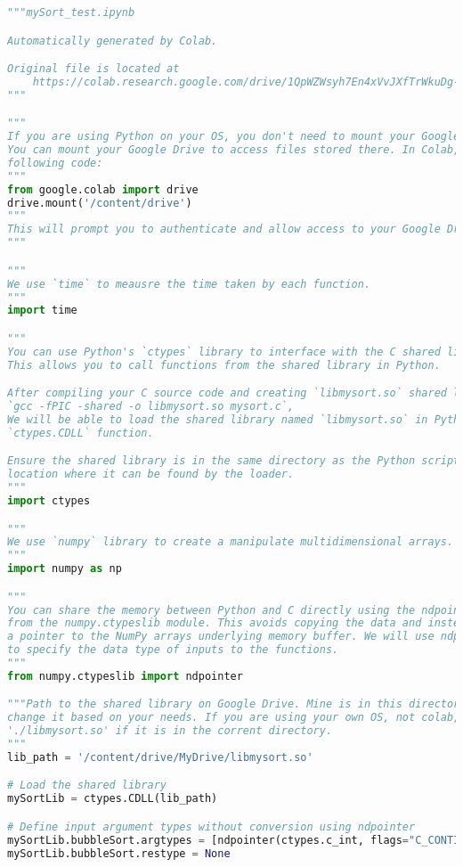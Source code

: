 \documentclass[12pt]{article}
\begin{document}
\begin{lstlisting}[language=python]
"""mySort_test.ipynb

Automatically generated by Colab.

Original file is located at
    https://colab.research.google.com/drive/1QpWZWsyh7En4xVvJXfTrWkuDg-YcOtoK
"""

"""
If you are using Python on your OS, you don't need to mount your Google Drive.
You can mount your Google Drive to access files stored there. In Colab, run the
following code:
"""
from google.colab import drive
drive.mount('/content/drive')
"""
This will prompt you to authenticate and allow access to your Google Drive.
"""

"""
We use `time` to meausre the time taken by each function.
"""
import time

"""
You can use Python's `ctypes` library to interface with the C shared library.
This allows you to call functions from the shared library in Python.

After compiling your C source code and creating `libmysort.so` shared lib with:
`gcc -fPIC -shared -o libmysort.so mysort.c`,
We will be able to load the shared library named `libmysort.so` in Python using
`ctypes.CDLL` function.

Ensure the shared library is in the same directory as the Python script or in a
location where it can be found by the loader.
"""
import ctypes

"""
We use `numpy` library to create a manipulate multidimensional arrays.
"""
import numpy as np

"""
You can share the memory between Python and C directly using the ndpointer class
from the numpy.ctypeslib module. This avoids copying the data and instead passes
a pointer to the NumPy arrays underlying memory buffer. We will use ndpointer
to specify the data type of inputs to the functions.
"""
from numpy.ctypeslib import ndpointer

"""Path to the shared library on Google Drive. Mine is in this directory, you can
change it based on your needs. If you are using your own OS, not colab, just use
'./libmysort.so' if it is in the corrent directory.
"""
lib_path = '/content/drive/MyDrive/libmysort.so'

# Load the shared library
mySortLib = ctypes.CDLL(lib_path)

# Define input argument types without conversion using ndpointer
mySortLib.bubbleSort.argtypes = [ndpointer(ctypes.c_int, flags="C_CONTIGUOUS"), ctypes.c_int]
mySortLib.bubbleSort.restype = None


\end{lstlisting}
\end{document}
